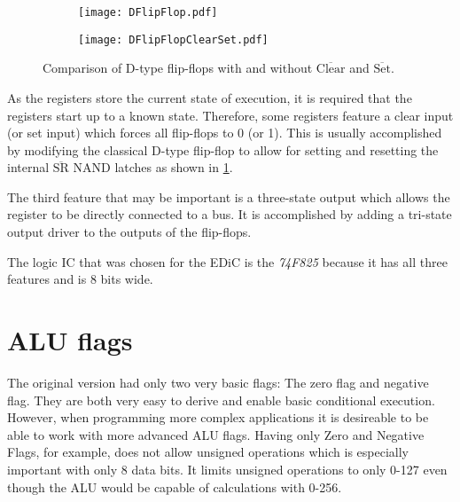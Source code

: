 \begin{figure}[t]
  \centering
  \begin{subfigure}[b]{.45\textwidth}
    \texttt{[image: DFlipFlop.pdf]}
  \end{subfigure}%
  \hspace{.05\textwidth}
  \begin{subfigure}[b]{.45\textwidth}
    \texttt{[image: DFlipFlopClearSet.pdf]}
  \end{subfigure}
  \caption{Comparison of D-type flip-flops with and without $\overline{\text{Clear}}$ and $\overline{\text{Set}}$.}
  \label{fig:clearSet}
\end{figure}
As the registers store the current state of execution, it is required that the registers start up to a known state.
Therefore, some registers feature a clear input (or set input) which forces all flip-flops to 0 (or 1).
This is usually accomplished by modifying the classical D-type flip-flop to allow for setting and resetting the internal $\overline{\text{SR}}$ NAND latches as shown in \cref{fig:clearSet}.

The third feature that may be important is a three-state output which allows the register to be directly connected to a bus.
It is accomplished by adding a tri-state output driver to the outputs of the flip-flops.

The logic \gls{IC} that was chosen for the \gls{EDiC} is the \emph{74F825} because it has all three features and is 8 bits wide.

\section{\gls{ALU} flags}\label{sec:aluFlags}
The original version had only two very basic flags: The zero flag and negative flag.
They are both very easy to derive and enable basic conditional execution.
However, when programming more complex applications it is desireable to be able to work with more advanced \gls{ALU} flags.
Having only Zero and Negative Flags, for example, does not allow unsigned operations which is especially important with only 8 data bits.
It limits unsigned operations to only 0-127 even though the \gls{ALU} would be capable of calculations with 0-256.

